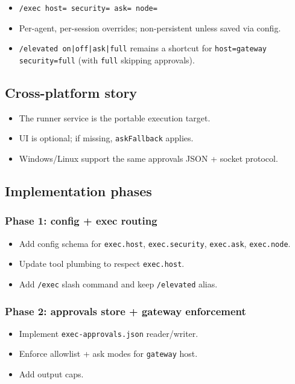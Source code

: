 \begin{itemize}
  \item \texttt{/exec host= security= ask= node=}
  \item Per-agent, per-session overrides; non-persistent unless saved via config.
  \item \texttt{/elevated on|off|ask|full} remains a shortcut for \texttt{host=gateway security=full} (with \texttt{full} skipping approvals).
\end{itemize}


\subsection{Cross-platform story}


\begin{itemize}
  \item The runner service is the portable execution target.
  \item UI is optional; if missing, \texttt{askFallback} applies.
  \item Windows/Linux support the same approvals JSON + socket protocol.
\end{itemize}


\subsection{Implementation phases}


\subsubsection{Phase 1: config + exec routing}


\begin{itemize}
  \item Add config schema for \texttt{exec.host}, \texttt{exec.security}, \texttt{exec.ask}, \texttt{exec.node}.
  \item Update tool plumbing to respect \texttt{exec.host}.
  \item Add \texttt{/exec} slash command and keep \texttt{/elevated} alias.
\end{itemize}


\subsubsection{Phase 2: approvals store + gateway enforcement}


\begin{itemize}
  \item Implement \texttt{exec-approvals.json} reader/writer.
  \item Enforce allowlist + ask modes for \texttt{gateway} host.
  \item Add output caps.
\end{itemize}


